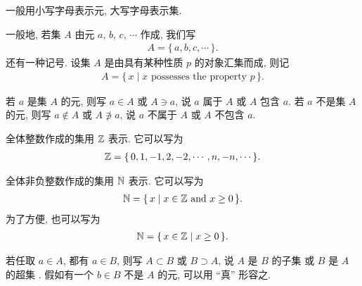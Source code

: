 \begin{remark}
    一般用小写字母表示元, 大写字母表示集.
\end{remark}

\begin{definition}
    一般地, 若集 $A$ 由元 $a$, $b$, $c$, $\cdots$ 作成, 我们写
    \begin{align*}
        A = \{\, a,b,c,\cdots \,\}.
    \end{align*}
    还有一种记号. 设集 $A$ 是由具有某种性质 $p$ 的对象汇集而成, 则记
    \begin{align*}
        A = \{\, x \mid x \text{ possesses the property } p \,\}.
    \end{align*}
\end{definition}

\begin{definition}
    若 $a$ 是集 $A$ 的元, 则写 $a \in A$ 或 $A \ni a$, 说 $a$ 属于  $A$ 或 $A$ 包含  $a$. 若 $a$ 不是集 $A$ 的元, 则写 $a \notin A$ 或 $A \not\ni a$, 说 $a$ 不属于 $A$ 或 $A$ 不包含 $a$.
\end{definition}

\begin{example}
    全体整数作成的集用 $\mathbb{Z}$  表示. 它可以写为
    \begin{align*}
        \mathbb{Z} = \{\, 0,1,-1,2,-2,\cdots,n,-n,\cdots \,\}.
    \end{align*}
\end{example}

\begin{example}
    全体非负整数作成的集用 $\mathbb{N}$  表示. 它可以写为
    \begin{align*}
        \mathbb{N} = \{\, x \mid x \in \mathbb{Z} \text{ and } x \geq 0 \,\}.
    \end{align*}
    为了方便, 也可以写为
    \begin{align*}
        \mathbb{N} = \{\, x \in \mathbb{Z} \mid x \geq 0 \,\}.
    \end{align*}
\end{example}

\begin{definition}
    若任取 $a \in A$, 都有 $a \in B$, 则写 $A \subset B$ 或 $B \supset A$, 说 $A$ 是 $B$ 的子集  或 $B$ 是 $A$ 的超集 . 假如有一个 $b \in B$ 不是 $A$ 的元, 可以用 ``真''  形容之.
\end{definition}

